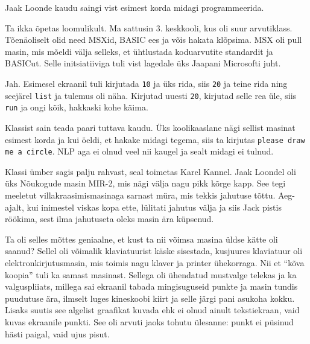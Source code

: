 Jaak Loonde kaudu saingi vist esimest korda midagi 
programmeerida. 


Ta ikka õpetas loomulikult. Ma sattusin 3. 
keskkooli, kus oli suur arvutiklass. Tõenäoliselt 
olid need MSXid, BASIC ees ja võis hakata klõpsima. 
MSX oli pull masin, mis mõeldi välja selleks, et 
ühtlustada koduarvutite standardit ja BASICut. Selle 
initsiatiiviga tuli vist lagedale üks Jaapani Microsofti juht.


Jah. Esimesel ekraanil tuli kirjutada \verb|10| ja üks rida, siis \verb|20| ja 
teine 
rida ning seejärel \verb|list| ja tulemus oli näha. Kirjutad uuesti 
\verb|20|, kirjutad selle rea üle, siis \verb|run| ja ongi kõik, 
hakkaski kohe käima. 

Klassist sain teada paari tuttava kaudu. Üks koolikaaslane nägi sellist
masinat esimest korda ja kui öeldi, et hakake midagi tegema, siis ta 
kirjutas \verb|please draw me a circle|. NLP aga ei olnud veel nii 
kaugel 
ja sealt midagi ei tulnud.

Klassi ümber sagis palju rahvast, seal toimetas Karel Kannel. 
Jaak Loondel oli üks Nõukogude masin 
MIR-2, mis nägi välja nagu 
pikk kõrge kapp. See tegi meeletut villakraasimismasinaga sarnast 
müra, mis tekkis jahutuse tõttu. Aeg-ajalt, kui inimestel 
viskas kopa ette, lülitati jahutus välja ja siis 
Jack pistis
röökima, sest ilma jahutuseta oleks masin ära küpsenud. 

Ta oli selles mõttes geniaalne, et kust ta nii võimsa masina üldse kätte oli 
saanud? Sellel oli võimalik klaviatuurist käske 
sisestada, kusjuures klaviatuur oli elektronkirjutusmasin, mis toimis
nagu klaver ja printer ühekorraga. Nii et \enquote{kõva koopia} tuli ka samast 
masinast. Sellega oli ühendatud mustvalge telekas ja ka 
valguspliiats, millega sai ekraanil tabada mingisuguseid punkte ja 
masin tundis puudutuse ära, ilmselt luges kineskoobi kiirt ja selle järgi 
pani asukoha kokku. Lisaks suutis see algelist graafikat 
kuvada ehk ei olnud ainult tekstiekraan, vaid kuvas ekraanile 
punkti. See oli arvuti jaoks tohutu ülesanne: punkt ei 
püsinud hästi paigal, vaid ujus pisut. 

